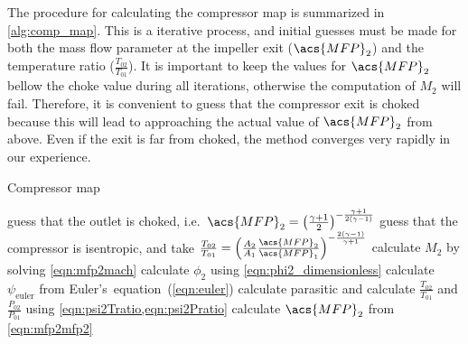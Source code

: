 The procedure for calculating the compressor map is summarized in \cref{alg:comp_map}. 
This is a iterative process, and initial guesses must be made for both 
the mass flow parameter at the impeller exit ($\acs{MFP}_2$) and the temperature ratio 
($\tfrac{T_{02}}{T_{01}}$). 
It is important to keep the values for $\acs{MFP}_2$ bellow the choke value during all iterations,
otherwise the computation of $M_2$ will fail. 
Therefore, it is convenient to guess that the compressor exit is choked because this will lead 
to approaching the actual value of $\acs{MFP}_2$ from above.
Even if the exit is far from choked, the method converges very rapidly in our experience.

\begin{algorithm}
    \caption{Compressor map}
    \label{alg:comp_map}

    
    guess that the outlet is choked, i.e.\ 
        $\acs{MFP}_2 = \left( \frac{\gamma+1}{2}\right)^{-\frac{\gamma+1}{2(\gamma-1)}} $\;
    guess that the compressor is isentropic, and take
     $\frac{T_{02}}{T_{01}} = \left(\frac{A_2}{A_1}\frac{\acs{MFP}_2}{\acs{MFP}_1}\right)^{-\frac{2(\gamma-1)}{\gamma+1}} $\;
    \Repeat{$\acs{MFP}_2$ converges} {
        calculate $M_2$ by solving \cref{eqn:mfp2mach}\;
        calculate $\phi_2$ using \cref{eqn:phi2_dimensionless}\;
        calculate $\psi_\text{euler}$ from Euler's~equation~(\ref{eqn:euler})\;
        calculate parasitic and 
        calculate $\frac{T_{02}}{T_{01}}$ and $\frac{P_{02}}{P_{01}}$ 
            using \cref{eqn:psi2Tratio,eqn:psi2Pratio} \;
        calculate $\acs{MFP}_2$ from \cref{eqn:mfp2mfp2}\;
}

\end{algorithm}

